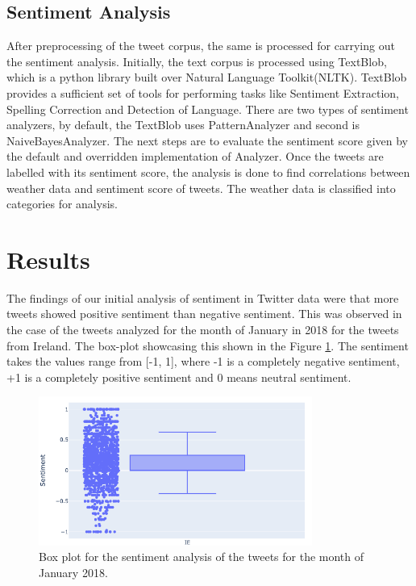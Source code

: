 \documentclass[a4paper,10pt]{article}
\begin{document}
	\subsection{Sentiment Analysis}
	
	After preprocessing of the tweet corpus, the same is processed for carrying out the sentiment analysis. Initially, the text corpus is processed using TextBlob, which is a python library built over Natural Language Toolkit(NLTK). TextBlob provides a sufficient set of tools for performing tasks like Sentiment Extraction, Spelling Correction and Detection of Language. There are two types of sentiment analyzers, by default, the TextBlob uses PatternAnalyzer and second is NaiveBayesAnalyzer. The next steps are to evaluate the sentiment score given by the default and overridden implementation of Analyzer. Once the tweets are labelled with its sentiment score, the analysis is done to find correlations between weather data and sentiment score of tweets. The weather data is classified into categories for analysis. 


    \section{Results}
    
    The findings of our initial analysis of sentiment in Twitter data were that more tweets showed positive sentiment than negative sentiment. This was observed in the case of the tweets analyzed for the month of January in 2018 for the tweets from Ireland. The box-plot showcasing this shown in the Figure \ref{fig:box_plot_jan_2018}. The sentiment takes the values range from [-1, 1], where -1 is a completely negative sentiment, +1 is a completely positive sentiment and 0 means neutral sentiment.
    
    \begin{figure}
    	\includegraphics[width=0.8\textwidth]{boxplot_Jan2018.png}
    	\caption{Box plot for the sentiment analysis of the tweets for the month of January 2018.}
    	\label{fig:box_plot_jan_2018}
    \end{figure}
\end{document}

